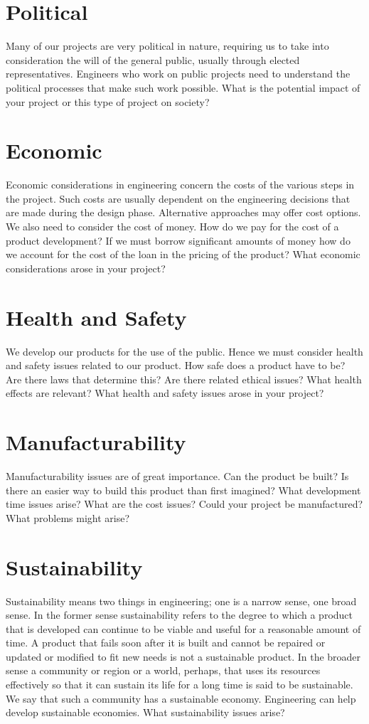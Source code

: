 \section{Political}
Many of our projects are very political in nature, requiring us to take into consideration the will of the general public, usually through elected representatives. Engineers who work on public projects need to understand the political processes that make such work possible. What is the potential impact of your project or this type of project on society?

\section{Economic}
Economic considerations in engineering concern the costs of the various steps in the project. Such costs are usually dependent on the engineering decisions that are made during the design phase. Alternative approaches may offer cost options. We also need to consider the cost of money. How do we pay for the cost of a product development? If we must borrow significant amounts of money how do we account for the cost of the loan in the pricing of the product? What economic considerations arose in your project?

\section{Health and Safety}
We develop our products for the use of the public. Hence we must consider health and safety issues related to our product. How safe does a product have to be? Are there laws that determine this? Are there related ethical issues? What health effects are relevant? What health and safety issues arose in your project?

\section{Manufacturability}
Manufacturability issues are of great importance. Can the product be built? Is there an easier way to build this product than first imagined? What development time issues arise? What are the cost issues? Could your project be manufactured? What problems might arise?

\section{Sustainability} 
Sustainability means two things in engineering; one is a narrow sense, one broad sense. In the former sense sustainability refers to the degree to which a product that is developed can continue to be viable and useful for a reasonable amount of time. A product that fails soon after it is built and cannot be repaired or updated or modified to fit new needs is not a sustainable product. In the broader sense a community or region or a world, perhaps, that uses its resources effectively so that it can sustain its life for a long time is said to be sustainable. We say that such a community has a sustainable economy. Engineering can help develop sustainable economies. What sustainability issues arise?

